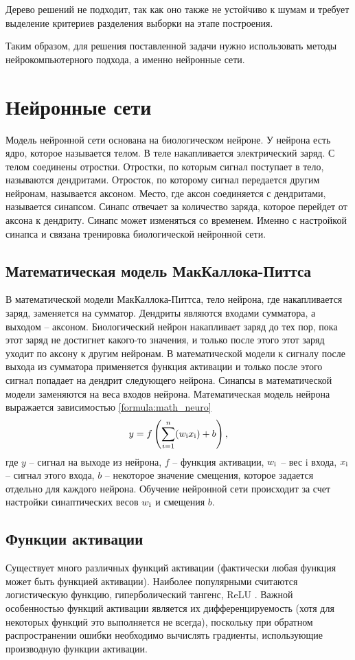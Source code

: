 Дерево решений не подходит, так как оно также не устойчиво к шумам и требует выделение критериев разделения выборки на этапе построения.

Таким образом, для решения поставленной задачи нужно использовать методы нейрокомпьютерного подхода, а именно нейронные сети.

\section{Нейронные сети}\label{sec:neuro_net}
Модель нейронной сети основана на биологическом нейроне. У нейрона есть ядро, которое называется телом. В теле накапливается электрический заряд. С телом соединены отростки. Отростки, по которым сигнал поступает в тело, называются дендритами. Отросток, по которому сигнал передается другим нейронам, называется аксоном. Место, где аксон соединяется с дендритами, называется синапсом. Синапс отвечает за количество заряда, которое перейдет от аксона к дендриту. Синапс может изменяться со временем. Именно с настройкой синапса и связана тренировка биологической нейронной сети.

\subsection{Математическая модель МакКаллока-Питтса}
В математической модели МакКаллока-Питтса, тело нейрона, где накапливается заряд, заменяется на сумматор. Дендриты являются входами сумматора, а выходом -- аксоном. Биологический нейрон накапливает заряд до тех пор, пока этот заряд не достигнет какого-то значения, и только после этого этот заряд уходит по аксону к другим нейронам. В математической модели к сигналу после выхода из сумматора применяется функция активации и только после этого сигнал попадает на дендрит следующего нейрона. Синапсы в математической модели заменяются на веса входов нейрона. Математическая модель нейрона выражается зависимостью \ref{formula:math_neuro}
\begin{equation}\label{formula:math_neuro}
y = f\left(\sum\limits_{i = 1}^{n}(w_{\rm{i}}x_{\rm{i}}) + b\right),
\end{equation}
где $y$ -- сигнал на выходе из нейрона, $f$ -- функция активации, $w_{\rm{i}}$ -- вес i входа, $x_{\rm{i}}$ -- сигнал этого входа, $b$ -- некоторое значение смещения, которое задается отдельно для каждого нейрона. Обучение нейронной сети происходит за счет настройки синаптических весов $w_{\rm{i}}$ и смещения $b$.

\subsection{Функции активации}
Существует много различных функций активации (фактически любая функция может быть функцией активации). Наиболее популярными считаются логистическую функцию, гиперболический тангенс, ReLU \cite{activation_function}. Важной особенностью функций активации является их дифференцируемость (хотя для некоторых функций это выполняется не всегда), поскольку при обратном распространении ошибки необходимо вычислять градиенты, использующие производную функции активации.

